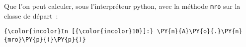     \begin{Shaded}
\begin{Highlighting}[frame=lines,framerule=0.6mm,rulecolor=\color{asisframecolor}]
                              \OperatorTok{---}
                  \OperatorTok{|}\OperatorTok{|}
                           \OperatorTok{/}  \OperatorTok{---}  \OperatorTok{\textbackslash{}}
                          \OperatorTok{/}    \OperatorTok{|}    \OperatorTok{\textbackslash{}}
                         \OperatorTok{/}     \OperatorTok{|}     \OperatorTok{\textbackslash{}}
                        \OperatorTok{/}      \OperatorTok{|}      \OperatorTok{\textbackslash{}}
                      \OperatorTok{---}     \OperatorTok{---}    \OperatorTok{---}
         \OperatorTok{|}\OperatorTok{|}  \OperatorTok{|}\OperatorTok{|}  \OperatorTok{|}\OperatorTok{|} 
                      \OperatorTok{---}     \OperatorTok{---}    \OperatorTok{---}
                       \OperatorTok{\textbackslash{}}      \OperatorTok{/} \OperatorTok{\textbackslash{}}     \OperatorTok{/}
                        \OperatorTok{\textbackslash{}}    \OperatorTok{/}   \OperatorTok{\textbackslash{}}   \OperatorTok{/}
                         \OperatorTok{\textbackslash{}}  \OperatorTok{/}     \OperatorTok{\textbackslash{}} \OperatorTok{/}
                          \OperatorTok{---}     \OperatorTok{---}
             \OperatorTok{|}\OperatorTok{|}   \OperatorTok{|}\OperatorTok{|} 
                          \OperatorTok{---}     \OperatorTok{---}
                           \OperatorTok{\textbackslash{}}       \OperatorTok{/}
                            \OperatorTok{\textbackslash{}}     \OperatorTok{/}
                              \OperatorTok{---}
                 \OperatorTok{|}\OperatorTok{|}
                              \OperatorTok{---}
\end{Highlighting}
\end{Shaded}

    Que l'on peut calculer, sous l'interpréteur python, avec la méthode
\texttt{mro} sur la classe de départ~:

    \begin{Verbatim}[commandchars=\\\{\},frame=single,framerule=0.3mm,rulecolor=\color{cellframecolor}]
{\color{incolor}In [{\color{incolor}10}]:} \PY{n}{A}\PY{o}{.}\PY{n}{mro}\PY{p}{(}\PY{p}{)}
\end{Verbatim}


